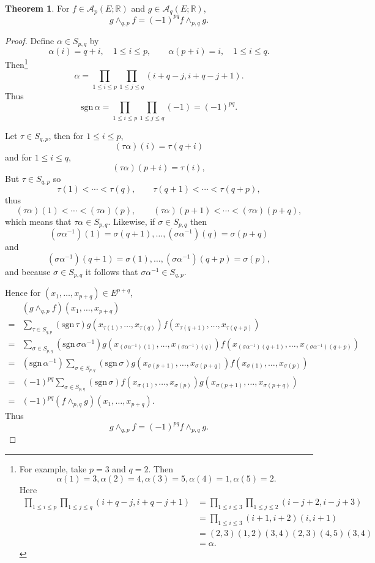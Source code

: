 \documentclass{article}
\newcommand{\sgn}{\mathrm{sgn}\,}
\theoremstyle{definition}
\newtheorem{theorem}{Theorem}
\theoremstyle{definition}
\begin{document}
\begin{theorem}
For $f \in \mathscr{A}_p(E;\mathbb{R})$ and  $g \in \mathscr{A}_q(E;\mathbb{R})$,
\[
g \wedge_{q,p} f = (-1)^{pq} f \wedge_{p,q} g.
\]
\label{swap}
\end{theorem}
\begin{proof}
Define $\alpha \in S_{p,q}$ by
\[
\alpha(i) = q+i,\quad 1 \leq i \leq p,\qquad \alpha(p+i) = i,\quad 1 \leq i \leq q.
\]
Then\footnote{For example, take $p=3$ and $q=2$. Then
\[
\alpha(1) = 3, \alpha(2) = 4, \alpha(3) = 5, \alpha(4) = 1, \alpha(5)=2.
\]
Here
\begin{align*}
\prod_{1 \leq i \leq p} \prod_{1 \leq j \leq q} (i+q-j,i+q-j+1)&=
\prod_{1 \leq i \leq 3} \prod_{1 \leq j \leq 2} (i-j+2,i-j+3)\\
&=\prod_{1 \leq i \leq 3} (i+1,i+2)(i,i+1)\\
&=(2,3)(1,2)(3,4)(2,3)(4,5)(3,4)\\
&=\alpha.
\end{align*}
}
\[
\alpha=\prod_{1 \leq i \leq p} \prod_{1 \leq j \leq q} (i+q-j,i+q-j+1).
\]
Thus
\[
\sgn \alpha = \prod_{1 \leq i \leq p} \prod_{1 \leq j \leq q} (-1)
=(-1)^{pq}.
\]


Let  $\tau \in S_{q,p}$, then 
for $1 \leq i \leq p$,
\[
(\tau \alpha)(i) = \tau(q+i)
\]
and
for $1 \leq i \leq q$,
\[
(\tau \alpha)(p+i) = \tau(i),
\]
But $\tau \in S_{q,p}$ so
\[
\tau(1)<\cdots<\tau(q),\qquad \tau(q+1)<\cdots<\tau(q+p),
\]
thus
\[
(\tau \alpha)(1)<\cdots<(\tau \alpha)(p),
\qquad (\tau \alpha)(p+1)<\cdots<(\tau\alpha)(p+q),
\]
which means that $\tau \alpha \in S_{p,q}$. 
Likewise, if $\sigma \in S_{p,q}$ then
\[
(\sigma \alpha^{-1})(1) = \sigma(q+1),
\ldots, (\sigma \alpha^{-1})(q) = \sigma(p+q)
\]
and
\[
(\sigma \alpha^{-1})(q+1)=\sigma(1),
\ldots, (\sigma \alpha^{-1})(q+p)=\sigma(p),
\]
and because $\sigma \in S_{p,q}$ it follows that
$\sigma \alpha^{-1} \in S_{q,p}$. 


Hence for
$(x_1,\ldots,x_{p+q}) \in E^{p+q}$,
\[
\begin{split}
&(g \wedge_{q,p} f)(x_1,\ldots,x_{p+q})\\
=&\sum_{\tau \in S_{q,p}} (\sgn \tau) g(x_{\tau(1)},\ldots,x_{\tau(q)}) f(x_{\tau(q+1)},\ldots,x_{\tau(q+p)})\\
=&\sum_{\sigma \in S_{p,q}} (\sgn \sigma \alpha^{-1}) g(x_{(\sigma \alpha^{-1})(1)},\ldots,
x_{(\sigma \alpha^{-1})(q)})
f(x_{(\sigma \alpha^{-1})(q+1)},\ldots,
x_{(\sigma \alpha^{-1})(q+p)})\\
=&(\sgn \alpha^{-1}) \sum_{\sigma \in S_{p,q}} (\sgn \sigma) g(x_{\sigma(p+1)},\ldots,x_{\sigma(p+q)})
f(x_{\sigma(1)},\ldots,x_{\sigma(p)})\\
=&(-1)^{pq} \sum_{\sigma \in S_{p,q}} (\sgn \sigma) f(x_{\sigma(1)},\ldots,x_{\sigma(p)}) g(x_{\sigma(p+1)},\ldots,x_{\sigma(p+q)})\\
=&(-1)^{pq} (f \wedge_{p,q} g)(x_1,\ldots,x_{p+q}).
\end{split}
\]
Thus
\[
g \wedge_{q,p} f = (-1)^{pq} f \wedge_{p,q} g. 
\]
\end{proof}
\end{document}
